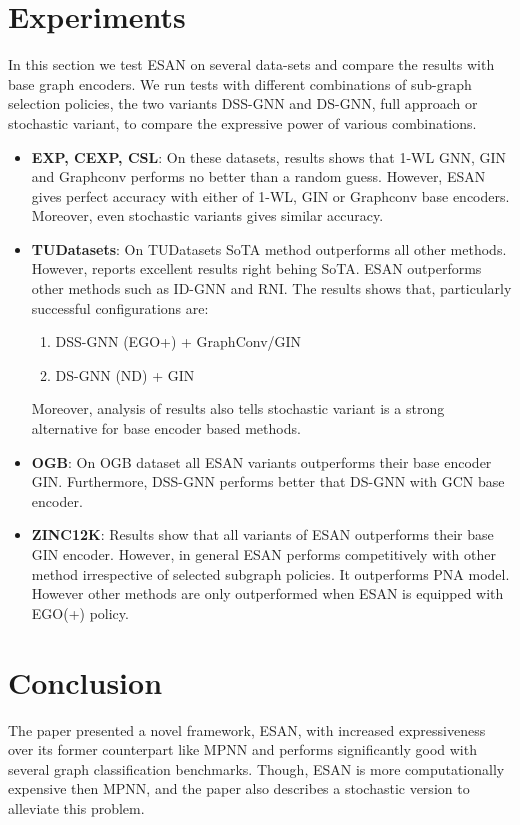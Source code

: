 \documentclass[11pt, dvipsnames, DIV=12]{scrreprt}
\theoremstyle{definition}
\begin{document}
\section{Experiments}
In this section we test ESAN on several data-sets and compare the results with base graph encoders. We run tests with different combinations of sub-graph selection policies, the two variants DSS-GNN and DS-GNN, full approach or stochastic variant, to compare the expressive power of various combinations.
\begin{itemize}
    \item \textbf{EXP, CEXP, CSL}: On these datasets, results shows that 1-WL GNN, GIN and Graphconv performs no better than a random guess. However, ESAN gives perfect accuracy with either of 1-WL, GIN or Graphconv base encoders. Moreover, even stochastic variants gives similar accuracy. 
    \item \textbf{TUDatasets}: On TUDatasets SoTA method outperforms all other methods. However, reports excellent results right behing SoTA. ESAN outperforms other methods such as ID-GNN and RNI. The results shows that, particularly successful configurations are:
    \begin{enumerate}
        \item DSS-GNN (EGO+) + GraphConv/GIN
        \item DS-GNN (ND) + GIN
    \end{enumerate}
    Moreover, analysis of results also tells stochastic variant is a strong alternative for base encoder based methods. 
    \item \textbf{OGB}: On OGB dataset all ESAN variants  outperforms their base encoder GIN. Furthermore, DSS-GNN performs better that DS-GNN with GCN base encoder.
    \item \textbf{ZINC12K}: Results show that all variants of ESAN outperforms their base GIN encoder. However, in general ESAN performs competitively with other method irrespective of selected subgraph policies. It outperforms PNA model. However other methods are only outperformed when ESAN is equipped with EGO(+) policy.
\end{itemize}

\section{Conclusion}
The paper presented a novel framework, ESAN, with increased expressiveness over its former counterpart like MPNN and performs significantly good with several graph classification benchmarks. Though, ESAN is more computationally expensive then MPNN, and the paper also describes a stochastic version to alleviate this problem.


\end{document}
